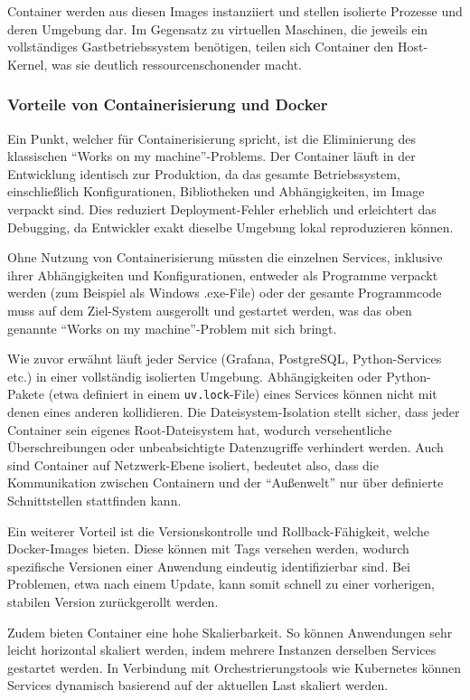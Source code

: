 Container werden aus diesen Images instanziiert und stellen isolierte Prozesse und deren Umgebung dar.
Im Gegensatz zu virtuellen Maschinen, die jeweils ein vollständiges Gastbetriebssystem benötigen, teilen sich Container den Host-Kernel, was sie deutlich ressourcenschonender macht. \cite{docker_overview}

\subsubsection{Vorteile von Containerisierung und Docker}
Ein Punkt, welcher für Containerisierung spricht, ist die Eliminierung des klassischen "`Works on my machine"'-Problems.
Der Container läuft in der Entwicklung identisch zur Produktion, da das gesamte Betriebssystem, einschließlich Konfigurationen, Bibliotheken und Abhängigkeiten, im Image verpackt sind.
Dies reduziert Deployment-Fehler erheblich und erleichtert das Debugging, da Entwickler exakt dieselbe Umgebung lokal reproduzieren können.

Ohne Nutzung von Containerisierung müssten die einzelnen Services, inklusive ihrer Abhängigkeiten und Konfigurationen, entweder als Programme verpackt werden (zum Beispiel als Windows .exe-File)
oder der gesamte Programmcode muss auf dem Ziel-System ausgerollt und gestartet werden, was das oben genannte "`Works on my machine"'-Problem mit sich bringt.

Wie zuvor erwähnt läuft jeder Service (Grafana, PostgreSQL, Python-Services etc.) in einer vollständig isolierten Umgebung.
Abhängigkeiten oder Python-Pakete (etwa definiert in einem \texttt{uv.lock}-File) eines Services können nicht mit denen eines anderen kollidieren.
Die Dateisystem-Isolation stellt sicher, dass jeder Container sein eigenes Root-Dateisystem hat, wodurch versehentliche Überschreibungen oder unbeabsichtigte Datenzugriffe verhindert werden.
Auch sind Container auf Netzwerk-Ebene isoliert, bedeutet also, dass die Kommunikation zwischen Containern und der "`Außenwelt"' nur über definierte Schnittstellen stattfinden kann.

Ein weiterer Vorteil ist die Versionskontrolle und Rollback-Fähigkeit, welche Docker-Images bieten.
Diese können mit Tags versehen werden, wodurch spezifische Versionen einer Anwendung eindeutig identifizierbar sind.
Bei Problemen, etwa nach einem Update, kann somit schnell zu einer vorherigen, stabilen Version zurückgerollt werden.

Zudem bieten Container eine hohe Skalierbarkeit. So können Anwendungen sehr leicht horizontal skaliert werden, indem mehrere Instanzen derselben Services gestartet werden.
In Verbindung mit Orchestrierungstools wie Kubernetes können Services dynamisch basierend auf der aktuellen Last skaliert werden.

